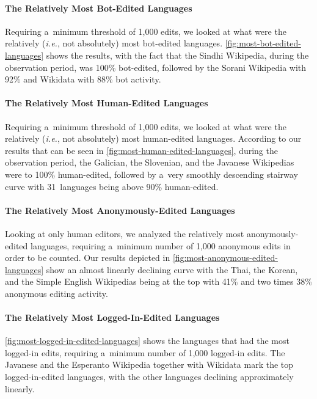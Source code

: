 \documentclass{sig-alternate}
\begin{document}
\paragraph{The Relatively Most Bot-Edited Languages}

Requiring a~minimum threshold of 1,000 edits,
we looked at what were the relatively
(\emph{i.e.}, not absolutely) most bot-edited languages.
\autoref{fig:most-bot-edited-languages} shows the results,
with the fact that the Sindhi Wikipedia,
during the observation period, was 100\% bot-edited,
followed by the Sorani Wikipedia with 92\%
and Wikidata with 88\% bot activity.

\paragraph{The Relatively Most Human-Edited Languages}

Requiring a~minimum threshold of 1,000 edits,
we looked at what were the relatively
(\emph{i.e.}, not absolutely) most human-edited languages.
According to our results that can be seen in \autoref{fig:most-human-edited-languages},
during the observation period,
the Galician, the Slovenian, and the Javanese Wikipedias
were to 100\% human-edited, followed by
a~very smoothly descending stairway curve
with 31~languages being above 90\% human-edited.

\paragraph{The Relatively Most Anonymously-Edited Languages}

Looking at only human editors, we analyzed the relatively
most anonymously-edited languages, requiring a~minimum
number of 1,000 anonymous edits in order to be counted.
Our results depicted in \autoref{fig:most-anonymous-edited-languages}
show an almost linearly declining curve with the Thai,
the Korean, and the Simple English Wikipedias being at the top
with 41\% and two times 38\% anonymous editing activity. 

\paragraph{The Relatively Most Logged-In-Edited Languages}

\autoref{fig:most-logged-in-edited-languages} shows
the languages that had the most logged-in edits,
requiring a~minimum number of 1,000 logged-in edits.
The Javanese and the Esperanto Wikipedia together with Wikidata
mark the top logged-in-edited languages,
with the other languages declining approximately linearly.
\end{document}
